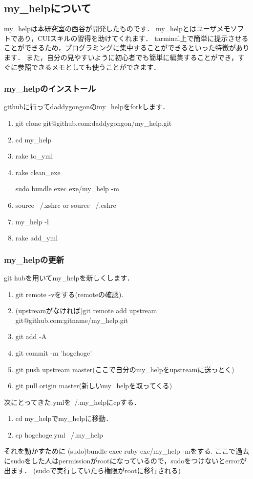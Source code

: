 
\subsection{my\_helpについて}
my\_helpは本研究室の西谷が開発したものです．
my\_helpとはユーザメモソフトであり，CUIスキルの習得を助けてくれます．
tarminal上で簡単に提示させることができるため，プログラミングに集中することができるといった特徴があります．
また，自分の見やすいように初心者でも簡単に編集することができ，すぐに参照できるメモとしても使うことができます．

\subsubsection{my\_helpのインストール}
githubに行ってdaddygongonのmy\_helpをforkします．

\begin{enumerate}
\item git clone git@github.com:daddygongon/my\_help.git
\item cd my\_help
\item rake to\_yml
\item rake clean\_exe
\item [sudo] bundle exec exe/my\_help -m
\item source ~/.zshrc or source ~/.cshrc
\item my\_help -l
\item rake add\_yml
\end{enumerate}
\subsubsection{my\_helpの更新}
git hubを用いてmy\_helpを新しくします．

\begin{enumerate}
\item git remote -vをする(remoteの確認).
\item (upstreamがなければ)git remote add upstream git@github.com:gitname/my\_help.git
\item git add -A
\item git commit -m 'hogehoge'
\item git push upstream master(ここで自分のmy\_helpをupstreamに送っとく)
\item git pull origin master(新しいmy\_helpを取ってくる)
\end{enumerate}
次にとってきた.ymlを~/.my\_helpにcpする．

\begin{enumerate}
\item cd my\_helpでmy\_helpに移動．
\item cp hogehoge.yml ~/.my\_help
\end{enumerate}
それを動かすために
(sudo)bundle exec ruby exe/my\_help -mをする.
ここで過去にsudoをした人はpermissionがrootになっているので，sudoをつけないとerrorが出ます．
(sudoで実行していたら権限がrootに移行される)

